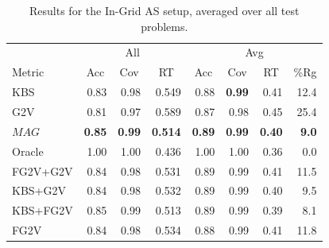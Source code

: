 \documentclass{ecai}
\newcommand{\Carmel}[1]{}
\newcommand{\Roni}[1]{}
\newcommand{\mapfgas}[1]{\ensuremath{\textit{MAG}}\xspace}
\begin{document}
\begin{table}
\begin{tabular}{@{}lrrr|rrrr@{}}
\toprule
         & \multicolumn{3}{c}{All}                                                    & \multicolumn{4}{c}{Avg}                                                                                \\ 
Metric   & \multicolumn{1}{c}{Acc} & \multicolumn{1}{c}{Cov} & \multicolumn{1}{c|}{RT} & \multicolumn{1}{c}{Acc} & \multicolumn{1}{c}{Cov} & \multicolumn{1}{c}{RT} & \multicolumn{1}{c}{\%Rg} \\ \midrule
KBS      & 0.83                    & 0.98                    & 0.549                  & 0.88                    & \textbf{0.99}           & 0.41                   & 12.4                      \\
G2V      & 0.81                    & 0.97                    & 0.589                 & 0.87                    & 0.98                    & 0.45                   & 25.4                      \\
\mapfgas\   & \textbf{0.85}           & \textbf{0.99}           & \textbf{0.514}         & \textbf{0.89}           & \textbf{0.99}           & \textbf{0.40}          & \textbf{9.0} \\ \midrule
Oracle   & 1.00                    & 1.00                    & 0.436                  & 1.00                    & 1.00                    & 0.36                   & 0.0                       \\\midrule
FG2V+G2V & 0.84                    & 0.98                    & 0.531                  & 0.89                    & 0.99                    & 0.41                   & 11.5                      \\
KBS+G2V  & 0.84                    & 0.98                    & 0.532                  & 0.89                    & 0.99                    & 0.40                   & 9.5                       \\
KBS+FG2V & 0.85                    & 0.99                    & 0.513                  & 0.89                    & 0.99                    & 0.39                   & 8.1                       \\
FG2V     & 0.84                    & 0.98                    & 0.534                  & 0.88                    & 0.99                    & 0.41                   & 11.8                      \\ \bottomrule
\end{tabular}
\label{tab:in-grid-all}
\caption{Results for the In-Grid AS setup, averaged over all test problems.} 
\end{table}
\end{document}
